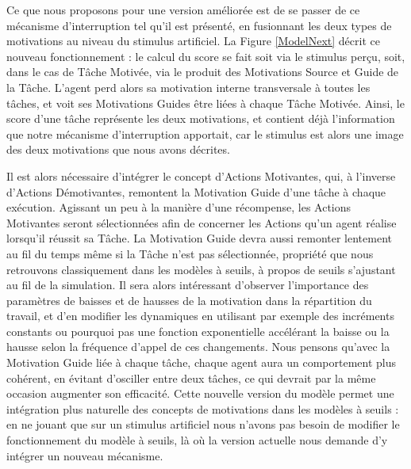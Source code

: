 	Ce que nous proposons pour une version améliorée est de se passer de ce mécanisme d'interruption tel qu'il est présenté, en fusionnant les deux types de motivations au niveau du stimulus artificiel. La Figure \ref{ModelNext} décrit ce nouveau fonctionnement : le calcul du score se fait soit via le stimulus perçu, soit, dans le cas de Tâche Motivée, via le produit des Motivations Source et Guide de la Tâche. L'agent perd alors sa motivation interne transversale à toutes les tâches, et voit ses Motivations Guides être liées à chaque Tâche Motivée. Ainsi, le score d'une tâche représente les deux motivations, et contient déjà l'information que notre mécanisme d'interruption apportait, car le stimulus est alors une image des deux motivations que nous avons décrites.
	
	Il est alors nécessaire d'intégrer le concept d'Actions Motivantes, qui, à l'inverse d'Actions Démotivantes, remontent la Motivation Guide d'une tâche à chaque exécution. Agissant un peu à la manière d'une récompense, les Actions Motivantes seront sélectionnées afin de concerner les Actions qu'un agent réalise lorsqu'il réussit sa Tâche. La Motivation Guide devra aussi remonter lentement au fil du temps même si la Tâche n'est pas sélectionnée, propriété que nous retrouvons classiquement dans les modèles à seuils, à propos de seuils s'ajustant au fil de la simulation. Il sera alors intéressant d'observer l'importance des paramètres de baisses et de hausses de la motivation dans la répartition du travail, et d'en modifier les dynamiques en utilisant par exemple des incréments constants ou pourquoi pas une fonction exponentielle accélérant la baisse ou la hausse selon la fréquence d'appel de ces changements. Nous pensons qu'avec la Motivation Guide liée à chaque tâche, chaque agent aura un comportement plus cohérent, en évitant d'osciller entre deux tâches, ce qui devrait par la même occasion augmenter son efficacité. Cette nouvelle version du modèle permet une intégration plus naturelle des concepts de motivations dans les modèles à seuils : en ne jouant que sur un stimulus artificiel nous n'avons pas besoin de modifier le fonctionnement du modèle à seuils, là où la version actuelle nous demande d'y intégrer un nouveau mécanisme.
	
